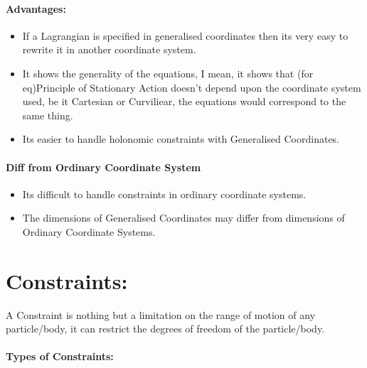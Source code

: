 \documentclass[a4paper]{article}
\begin{document}
		\paragraph*{Advantages:}
		\begin{itemize}
			\item If a Lagrangian is specified in generalised coordinates then its very easy to rewrite it in another coordinate system.
			\item It shows the generality of the equations, I mean, it shows that (for eq)Principle of Stationary Action doesn't depend upon the coordinate system used, be it Cartesian or Curviliear, the equations would correspond to the same thing.
			\item Its easier to handle holonomic constraints with Generalised Coordinates.
		\end{itemize}
		
		\paragraph*{Diff from Ordinary Coordinate System}
		\begin{itemize}
			\item Its difficult to handle constraints in ordinary coordinate systems.
			\item The dimensions of Generalised Coordinates may differ from dimensions of Ordinary Coordinate Systems.
		\end{itemize}

	\section*{Constraints: }
		
		\noindent

		A Constraint is nothing but a limitation on the range of motion of any particle/body, it can restrict the degrees of freedom of the particle/body.
		\paragraph*{Types of Constraints: }
\end{document}
